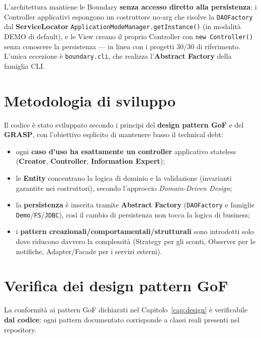 L'architettura mantiene le Boundary \textbf{senza accesso diretto alla
persistenza}: i Controller applicativi espongono un costruttore no-arg che
risolve la \texttt{DAOFactory} dal \textbf{ServiceLocator}
\texttt{ApplicationModeManager.getInstance()} (in modalità DEMO di default), e
le View creano il proprio Controller con \texttt{new Controller()} senza
conoscere la persistenza — in linea con i progetti 30/30 di riferimento.
L'unica eccezione è \texttt{boundary.cli}, che realizza l'\textbf{Abstract
Factory} della famiglia CLI.

\section{Metodologia di sviluppo}
\label{sec:qualita_metodologia}

Il codice è stato sviluppato secondo i principi del \textbf{design pattern GoF}
e del \textbf{GRASP}, con l'obiettivo esplicito di mantenere basso il technical
debt:

\begin{itemize}
    \item ogni \textbf{caso d'uso ha esattamente un controller} applicativo
    stateless (\textbf{Creator}, \textbf{Controller}, \textbf{Information Expert});
    \item le \textbf{Entity} concentrano la logica di dominio e la validazione
    (invarianti garantite nei costruttori), secondo l'approccio
    \emph{Domain-Driven Design};
    \item la \textbf{persistenza} è inserita tramite \textbf{Abstract Factory}
    (\texttt{DAOFactory} e famiglie \texttt{Demo}/\texttt{FS}/\texttt{JDBC}),
    così il cambio di persistenza non tocca la logica di business;
    \item i \textbf{pattern creazionali/comportamentali/strutturali} sono
    introdotti solo dove riducono davvero la complessità (Strategy per gli
    sconti, Observer per le notifiche, Adapter/Facade per i servizi esterni).
\end{itemize}

\section{Verifica dei design pattern GoF}
\label{sec:qualita_gof}

La conformità ai pattern GoF dichiarati nel Capitolo~\ref{cap:design} è
verificabile \textbf{dal codice}: ogni pattern documentato corrisponde a classi
reali presenti nel repository.

